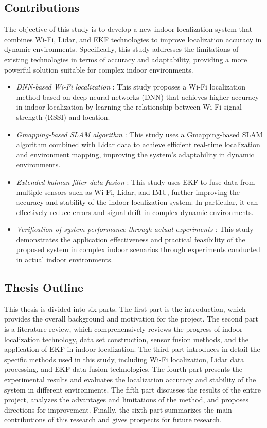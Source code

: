 \documentclass[12pt,a4paper]{article}
\numberwithin{equation}{section}
\begin{document}
\subsection{Contributions}
The objective of this study is to develop a new indoor localization system that combines Wi-Fi, Lidar, and EKF technologies to improve localization accuracy in dynamic environments. Specifically, this study addresses the limitations of existing technologies in terms of accuracy and adaptability, providing a more powerful solution suitable for complex indoor environments.
\begin{itemize}
    \item \textit{DNN-based Wi-Fi localization} : This study proposes a Wi-Fi localization method based on deep neural networks (DNN) that achieves higher accuracy in indoor localization by learning the relationship between Wi-Fi signal strength (RSSI) and location.
    
    \item \textit{Gmapping-based SLAM algorithm} : This study uses a Gmapping-based SLAM algorithm combined with Lidar data to achieve efficient real-time localization and environment mapping, improving the system's adaptability in dynamic environments.
    
    \item \textit{Extended kalman filter data fusion} : This study uses EKF to fuse data from multiple sensors such as Wi-Fi, Lidar, and IMU, further improving the accuracy and stability of the indoor localization system. In particular, it can effectively reduce errors and signal drift in complex dynamic environments.
    
    \item \textit{Verification of system performance through actual experiments} : This study demonstrates the application effectiveness and practical feasibility of the proposed system in complex indoor scenarios through experiments conducted in actual indoor environments.
\end{itemize}
\subsection{Thesis Outline}
This thesis is divided into six parts. The first part is the introduction, which provides the overall background and motivation for the project. The second part is a literature review, which comprehensively reviews the progress of indoor localization technology, data set construction, sensor fusion methods, and the application of EKF in indoor localization. The third part introduces in detail the specific methods used in this study, including Wi-Fi localization, Lidar data processing, and EKF data fusion technologies. The fourth part presents the experimental results and evaluates the localization accuracy and stability of the system in different environments. The fifth part discusses the results of the entire project, analyzes the advantages and limitations of the method, and proposes directions for improvement. Finally, the sixth part summarizes the main contributions of this research and gives prospects for future research.
\end{document}
